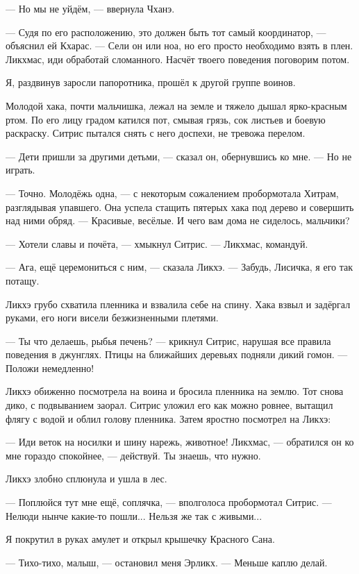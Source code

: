 --- Но мы не уйдём, --- ввернула Чханэ.

--- Судя по его расположению, это должен быть тот самый координатор, --- объяснил ей Кхарас.
--- Сели он или ноа, но его просто необходимо взять в плен.
Ликхмас, иди обработай сломанного.
Насчёт твоего поведения поговорим потом.

Я, раздвинув заросли папоротника, прошёл к другой группе воинов.

Молодой хака, почти мальчишка, лежал на земле и тяжело дышал ярко-красным ртом.
По его лицу градом катился пот, смывая грязь, сок листьев и боевую раскраску.
Ситрис пытался снять с него доспехи, не тревожа перелом.

--- Дети пришли за другими детьми, --- сказал он, обернувшись ко мне.
--- Но не играть.

--- Точно.
Молодёжь одна, --- с некоторым сожалением пробормотала Хитрам, разглядывая упавшего.
Она успела стащить пятерых хака под дерево и совершить над ними обряд.
--- Красивые, весёлые.
И чего вам дома не сиделось, мальчики?

--- Хотели славы и почёта, --- хмыкнул Ситрис.
--- Ликхмас, командуй.

--- Ага, ещё церемониться с ним, --- сказала Ликхэ.
--- Забудь, Лисичка, я его так потащу.

Ликхэ грубо схватила пленника и взвалила себе на спину.
Хака взвыл и задёргал руками, его ноги висели безжизненными плетями.

--- Ты что делаешь, рыбья печень? --- крикнул Ситрис, нарушая все правила поведения в джунглях.
Птицы на ближайших деревьях подняли дикий гомон.
--- Положи немедленно!

Ликхэ обиженно посмотрела на воина и бросила пленника на землю.
Тот снова дико, с подвыванием заорал.
Ситрис уложил его как можно ровнее, вытащил флягу с водой и облил голову пленника.
Затем яростно посмотрел на Ликхэ:

--- Иди веток на носилки и шину нарежь, животное!
Ликхмас, --- обратился он ко мне гораздо спокойнее, --- действуй.
Ты знаешь, что нужно.

Ликхэ злобно сплюнула и ушла в лес.

--- Поплюйся тут мне ещё, соплячка, --- вполголоса пробормотал Ситрис.
--- Нелюди нынче какие-то пошли...
Нельзя же так с живыми...

Я покрутил в руках амулет и открыл крышечку Красного Сана.

--- Тихо-тихо, малыш, --- остановил меня Эрликх.
--- Меньше каплю делай.

